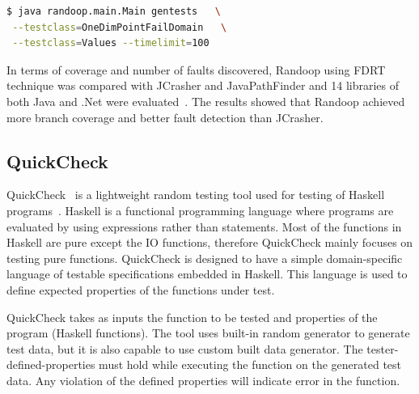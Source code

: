 \begin{lstlisting}[language=bash]
$ java randoop.main.Main gentests   \
 --testclass=OneDimPointFailDomain   \
 --testclass=Values --timelimit=100
\end{lstlisting}
\bigskip

In terms of coverage and number of faults discovered, Randoop using FDRT technique was compared with JCrasher and JavaPathFinder and 14 libraries of both Java and .Net were evaluated~\cite{visser2004test}. The results showed that Randoop achieved more branch coverage and better fault detection than JCrasher. 

\subsection{QuickCheck}
QuickCheck~\cite{claessen2011quickcheck} is a lightweight random testing tool used for testing of Haskell programs~\cite{hudak2007history}. Haskell is a functional programming language where programs are evaluated by using expressions rather than statements. Most of the functions in Haskell are pure except the IO functions, therefore QuickCheck mainly focuses on testing pure functions. QuickCheck is designed to have a simple domain-specific language of testable specifications embedded in Haskell. This language is used to define expected properties of the functions under test. %

QuickCheck takes as inputs the function to be tested and properties of the program (Haskell functions). The tool uses built-in random generator to generate test data, but it is also capable to use custom built data generator. The tester-defined-properties must hold while executing the function on the generated test data. Any violation of the defined properties will indicate error in the function.







